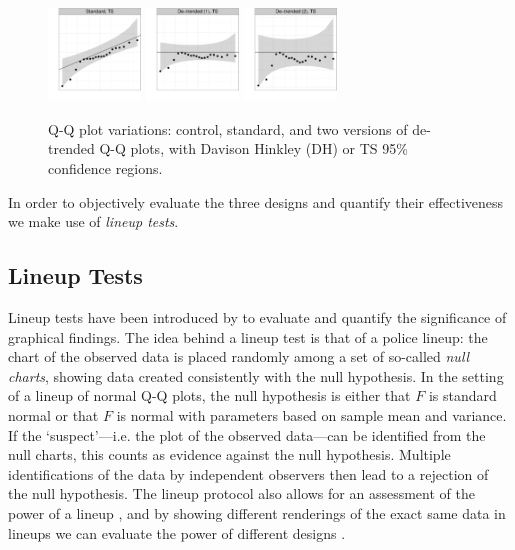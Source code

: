 \documentclass{article}\usepackage[]{graphicx}\usepackage[]{color}
\newcommand{\hh}[1]{{\color{magenta} #1}}
\begin{document}
\begin{figure}
\includegraphics[width=0.22\textwidth]{figures/qqplots-5}
\includegraphics[width=0.22\textwidth]{figures/qqplots-6}
\includegraphics[width=0.22\textwidth]{figures/qqplots-7}
\caption{ \label{qqplots} \hh{Q-Q plot variations:} control, standard, and \hh{two versions of} de-trended \hh{Q-Q plots}, with Davison Hinkley (DH) or TS 95\% confidence regions.}
\end{figure}
\afterpage{\clearpage}


In order to objectively evaluate  the three designs and quantify their effectiveness we make use of {\it lineup tests}.

\subsection{Lineup Tests}
Lineup tests have been introduced by \citet{buja:2009hp} to evaluate and quantify the significance of graphical findings. The idea behind a lineup test is that of a police lineup: the chart of the observed data is placed randomly among a set of so-called \emph{null charts}, showing data created consistently with the null hypothesis. In the setting of a lineup of normal Q-Q plots, the null hypothesis  is either that $F$ is standard normal or that $F$ is normal with parameters based on sample mean and variance.
If the `suspect'---i.e. the plot of the observed data---can be identified from the null charts, this counts as evidence against the null hypothesis. Multiple identifications of the data by independent observers then lead to a rejection of the null hypothesis. 
The lineup protocol also allows for an assessment of the power of a lineup \citep{mahbub:2013},  
and by showing different renderings of the exact same data in lineups we can evaluate the power  of different designs \citep{Hofmann:2012ts}.
\end{document}
